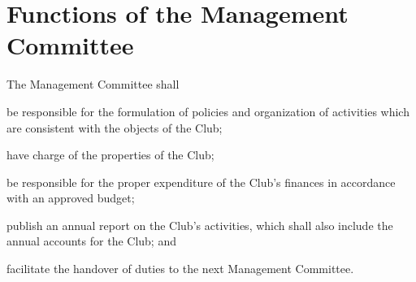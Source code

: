 \section{Functions of the Management Committee}
The Management Committee shall
	\begin{legal}
	\item be responsible for the formulation of policies and organization of activities which are consistent with the objects of the Club;
	\item have charge of the properties of the Club;
	\item be responsible for the proper expenditure of the Club's finances in accordance with an approved budget;
	\item publish an annual report on the Club's activities, which shall also include the annual accounts for the Club; and
	\item facilitate the handover of duties to the next Management Committee.
	\end{legal}


